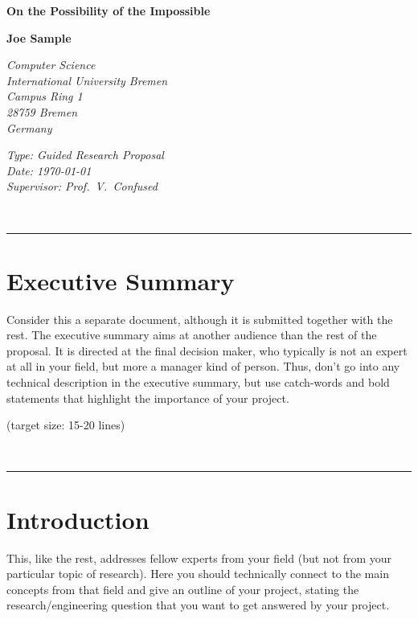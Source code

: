 \documentclass[a4paper,11pt,oneside]{article}
\begin{document}
  \thispagestyle{empty}

  \begin{flushleft}
    \textbf{\huge On the Possibility of the Impossible}
  \end{flushleft}
  \vspace*{6mm}
  \begin{flushleft}
    \textbf{\large Joe Sample}\\[2ex]
  \end{flushleft}
  \vspace*{1mm}
  \begin{flushleft}
    \textit{Computer Science \\
      International University Bremen \\
      Campus Ring 1 \\
      28759 Bremen \\
      Germany}
  \end{flushleft}
  \vspace*{6mm}
  \begin{flushleft}
    \textit{Type: Guided Research Proposal\\
      Date: \today \\
      Supervisor: Prof.\ V.\ Confused}
  \end{flushleft}
  \vspace*{2mm}
  ~\hrule

  \section*{Executive Summary}
  
  Consider this a separate document, although it is submitted together
  with the rest. The executive summary aims at another audience than
  the rest of the proposal. It is directed at the final decision
  maker, who typically is not an expert at all in your field, but more
  a manager kind of person. Thus, don't go into any technical
  description in the executive summary, but use catch-words and bold
  statements that highlight the importance of your project.

  (target size: 15-20 lines)

  ~\hrule

  \newpage

  \section{Introduction}

  This, like the rest, addresses fellow experts from your field (but
  not from your particular topic of research). Here you should
  technically connect to the main concepts from that field and give an
  outline of your project, stating the research/engineering question
  that you want to get answered by your project.
\end{document}
